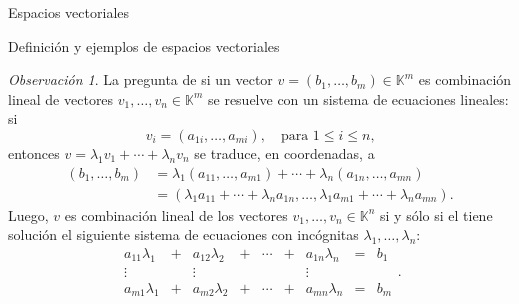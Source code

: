 \documentclass[a4paper,12pt,twoside,spanish]{amsbook}
\theoremstyle{definition}
\theoremstyle{remark}
\newtheorem{observacion}{Observaci\'on}[section]
\newcommand{\K}{\mathbb K}
\begin{document}
\begin{chapter}{Espacios vectoriales}
\begin{section}{Definición y ejemplos de espacios vectoriales}
		\begin{observacion}
			La pregunta de si un vector $v =(b_1,\ldots,b_m) \in \K^m$ es combinación lineal de vectores $v_1,\ldots,v_n \in \K^m$ se resuelve con un sistema de ecuaciones lineales: si 
			$$
			v_i = (a_{1i},\ldots,a_{mi}), \quad \text{para $1 \le i \le n$,}
			$$
			entonces $v = \lambda_1v_1 + \cdots +\lambda_nv_n$ se traduce, en coordenadas, a
			\begin{align*}
				(b_1,\ldots,b_m) &= \lambda_1(a_{11},\ldots,a_{m1}) + \cdots +\lambda_n(a_{1n},\ldots,a_{mn}) \\
				&= (\lambda_1a_{11} + \cdots+ \lambda_na_{1n}, \ldots, \lambda_1a_{m1} + \cdots+ \lambda_na_{mn}).
			\end{align*}
			Luego, $v$  es combinación lineal de los vectores $v_1,\ldots,v_n \in \K^n$ si y sólo si el tiene solución el siguiente sistema de ecuaciones con incógnitas $\lambda_1,\ldots, \lambda_n$: 
			\begin{equation*}
			\begin{matrix}
			a_{11}\lambda_1& + &a_{12}\lambda_2& + &\cdots& + &a_{1n}\lambda_n &= &b_1\\
			\vdots&  &\vdots& &&  &\vdots \\
			a_{m1}\lambda_1& + &a_{m2}\lambda_2& + &\cdots& + &a_{mn}\lambda_n &=&b_m
			\end{matrix}.
			\end{equation*}
		\end{observacion}
		

\end{section}
\end{chapter}
\end{document}

